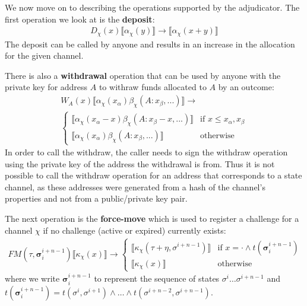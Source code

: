 \documentclass{article}
\theoremstyle{definition}
\newcommand{\adj}[1]{\llbracket #1 \rrbracket}
\begin{document}
We now move on to describing the operations supported by the adjudicator. The first operation we look at is the \textbf{deposit}:
\begin{align*}
D_\chi(x) \adj{\alpha_\chi(y)} \rightarrow \adj{\alpha_\chi(x + y)}
\end{align*}
The deposit can be called by anyone and results in an increase in the allocation for the given channel.

There is also a \textbf{withdrawal} operation that can be used by anyone with the private key for address $A$ to withraw funds allocated to $A$ by an outcome:
\begin{multline*}
W_A(x) \adj{\alpha_\chi(x_\alpha)\beta_\chi(A: x_\beta, ...)} \rightarrow \\
\begin{cases}
  \adj{\alpha_\chi(x_\alpha - x)\beta_\chi(A: x_\beta - x, ...)} &
  \text{if } x \leq x_\alpha, x_\beta  \\
  \adj{\alpha_\chi(x_\alpha)\beta_\chi(A: x_\beta, ...)} &
  \text{otherwise}
\end{cases}
\end{multline*}
In order to call the withdraw, the caller needs to sign the withdraw operation using the private key of the address the withdrawal is from. Thus it is not possible to call the withdraw operation for an address that corresponds to a state channel, as these addresses were generated from a hash of the channel's properties and not from a public/private key pair.

The next operation is the \textbf{force-move} which is used to register a challenge for a channel $\chi$ if no challenge (active or expired) currently exists:
\begin{align*}
FM(\tau, \bm{\sigma}_i^{i+n-1}) \adj{\kappa_\chi(x)} \rightarrow 
\begin{cases}
  \adj{\kappa_\chi(\tau + \eta, \sigma^{i+n-1})} &
  \text{if } x = \cdot \wedge t(\bm{\sigma}_i^{i+n-1}) \\
  \adj{\kappa_\chi(x)} &
  \text{otherwise}
\end{cases}
\end{align*}
where we write $\bm{\sigma}_i^{i+n-1}$ to represent the sequence of states $\sigma^i \dots \sigma^{i+n-1}$ and $t(\bm{\sigma}_i^{i+n-1}) = t(\sigma^{i}, \sigma^{i+1}) \wedge \dots \wedge t(\sigma^{i+n-2}, \sigma^{i+n-1})$.
\end{document}

